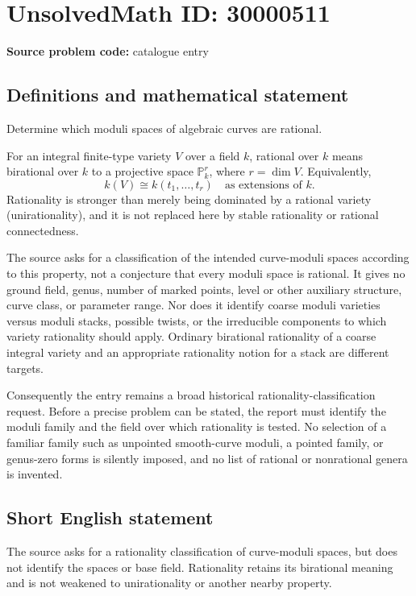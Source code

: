 \documentclass[11pt]{article}
\newcommand{\PP}{\mathbb{P}}
\begin{document}
\section*{UnsolvedMath ID: 30000511}
\textbf{Source problem code:} catalogue entry
\subsection{Definitions and mathematical statement}
Determine which moduli spaces of algebraic curves are rational.

For an integral finite-type variety $V$ over a field $k$, rational over $k$ means birational over $k$ to a projective space $\PP^r_k$, where $r=\dim V$. Equivalently,
\[
 k(V)\cong k(t_1,\ldots,t_r)
 \quad\text{as extensions of }k.
\]
Rationality is stronger than merely being dominated by a rational variety (unirationality), and it is not replaced here by stable rationality or rational connectedness.

The source asks for a classification of the intended curve-moduli spaces according to this property, not a conjecture that every moduli space is rational. It gives no ground field, genus, number of marked points, level or other auxiliary structure, curve class, or parameter range. Nor does it identify coarse moduli varieties versus moduli stacks, possible twists, or the irreducible components to which variety rationality should apply. Ordinary birational rationality of a coarse integral variety and an appropriate rationality notion for a stack are different targets.

Consequently the entry remains a broad historical rationality-classification request. Before a precise problem can be stated, the report must identify the moduli family and the field over which rationality is tested. No selection of a familiar family such as unpointed smooth-curve moduli, a pointed family, or genus-zero forms is silently imposed, and no list of rational or nonrational genera is invented.
\subsection{Short English statement}
The source asks for a rationality classification of curve-moduli spaces, but does not identify the spaces or base field. Rationality retains its birational meaning and is not weakened to unirationality or another nearby property.
\end{document}
